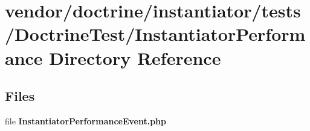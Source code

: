 \section{vendor/doctrine/instantiator/tests/\+Doctrine\+Test/\+Instantiator\+Performance Directory Reference}
\label{dir_4bff41ea90ba532b6f98cbf1cb7b856d}
\subsection*{Files}
\begin{DoxyCompactItemize}
\item 
file {\bf Instantiator\+Performance\+Event.\+php}
\end{DoxyCompactItemize}
